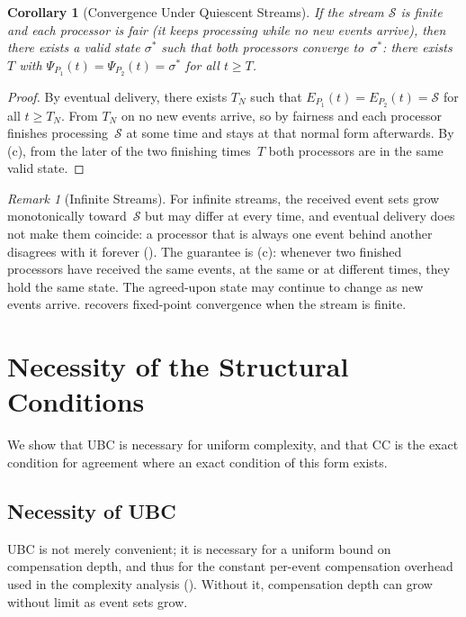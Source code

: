 \documentclass[11pt,a4paper]{article}
\theoremstyle{plain}
\newtheorem{corollary}[theorem]{Corollary}
\theoremstyle{definition}
\theoremstyle{remark}
\newtheorem{remark}[theorem]{Remark}
\renewcommand{\_}{\textunderscore\allowbreak}
\begin{document}
\begin{corollary}[Convergence Under Quiescent Streams]
\label{cor:quiescent}
If the stream $\mathcal{S}$ is finite and each processor is fair (it keeps
processing while no new events arrive), then there exists a valid state
$\sigma^*$ such that both processors converge to~$\sigma^*$: there exists $T$
with $\Psi_{P_1}(t) = \Psi_{P_2}(t) = \sigma^*$ for all $t \geq T$.
\end{corollary}
\begin{proof}
By eventual delivery, there exists $T_N$ such that
$E_{P_1}(t) = E_{P_2}(t) = \mathcal{S}$ for all $t \geq T_N$.  From $T_N$ on no
new events arrive, so by fairness and  each processor
finishes processing~$\mathcal{S}$ at some time and stays at that normal form
afterwards.  By (c), from the later of the two finishing
times~$T$ both processors are in the same valid state.
\end{proof}

\begin{remark}[Infinite Streams]
\label{rem:infinite-streams}
For infinite streams, the received event sets grow monotonically
toward~$\mathcal{S}$ but may differ at every time, and eventual delivery does
not make them coincide: a processor that is always one event behind another
disagrees with it forever ().  The guarantee is
(c): whenever two finished processors have received the
same events, at the same or at different times, they hold the same state.
The agreed-upon state may continue to change as new events arrive.
 recovers fixed-point convergence when the stream is
finite.
\end{remark}

\section{Necessity of the Structural Conditions}
\label{sec:necessity}

We show that UBC is necessary for uniform complexity, and that CC is the exact
condition for agreement where an exact condition of this form exists.

\subsection{Necessity of UBC}

UBC is not merely convenient; it is necessary for a uniform bound on
compensation depth, and thus for the constant per-event compensation overhead
used in the complexity analysis ().  Without it,
compensation depth can grow without limit as event sets grow.
\end{document}
